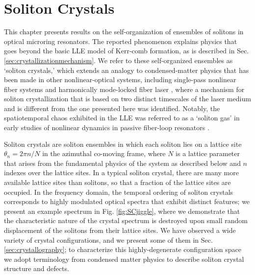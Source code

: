 \chapter{Soliton Crystals} \label{ch:SolitonCrystals}

This chapter presents results on the self-organization of ensembles of solitons in optical microring resonators. The reported phenomenon explains physics that goes beyond the basic LLE model of Kerr-comb formation, as is described in Sec. \ref{sec:crystallizationmechanism}. We refer to these self-organized ensembles as `soliton crystals,' which extends an analogy to condensed-matter physics that has been made in other nonlinear-optical systems, including single-pass nonlinear fiber systems \cite{Zajnulina2017} and harmonically mode-locked fiber laser \cite{Haboucha2008,Amrani2011a}, where a mechanism for soliton crystallization that is based on two distinct timescales of the laser medium \cite{Haboucha2008c} and is different from the one presented here was identified. Notably, the spatiotemporal chaos exhibited in the LLE was referred to as a `soliton gas' in early studies of nonlinear dynamics in passive fiber-loop resonators \cite{Malomed1998,Mitschke1998,Schwache1997}. 

Soliton crystals are soliton ensembles in which each soliton lies on a lattice site $\theta_n= 2\pi n/N$ in the azimuthal co-moving frame, where $N$ is a lattice parameter that arises from the fundamental physics of the system as described below and $n$ indexes over the lattice sites. In a typical soliton crystal, there are many more available lattice sites than solitons, so that a fraction of the lattice sites are occupied. In the frequency domain, the temporal ordering of soliton crystals corresponds to highly modulated optical spectra that exhibit distinct features; we present an example spectrum in Fig. \ref{fig:SCjiggle}, where we demonstrate that the characteristic nature of the crystal spectrum is destroyed upon small random displacement of the solitons from their lattice sites. We have observed a wide variety of crystal configurations, and we present some of them in Sec. \ref{sec:crystallography}; to characterize this highly-degenerate configuration space we adopt terminology from condensed matter physics to describe soliton crystal structure and defects. 

